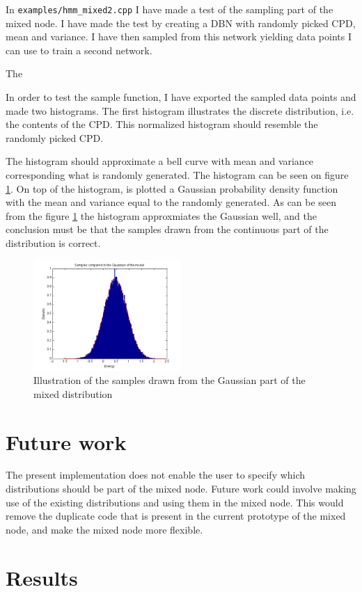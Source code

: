 \documentclass[10pt, conference, compsocconf,a4paper]{IEEEtran}
\begin{document}
In \texttt{examples/hmm\_mixed2.cpp} I have made a test of the sampling part of the mixed node. I have made the test by creating a DBN with randomly picked CPD, mean and variance. I have then sampled from this network yielding data points I can use to train a second network.

The 

In order to test the sample function, I have exported the sampled data points and made two histograms. The first histogram illustrates the discrete distribution, i.e. the contents of the CPD. This normalized histogram should resemble the randomly picked CPD.

The histogram should approximate a bell curve with mean and variance corresponding what is randomly generated. The histogram can be seen on figure \ref{fig1}. On top of the histogram, is plotted a Gaussian probability density function with the mean and variance equal to the randomly generated. As can be seen from the figure \ref{fig1} the histogram approxmiates the Gaussian well, and the conclusion must be that the samples drawn from the continuous part of the distribution is correct.

\begin{figure}
\centering
\includegraphics[width=0.5\textwidth]{figures/fig1.png}
\caption{Illustration of the samples drawn from the Gaussian part of the mixed distribution}
\label{fig1}
\end{figure}



\section{Future work} %
\label{sec:future_work}
The present implementation does not enable the user to specify which distributions should be part of the mixed node. Future work could involve making use of the existing distributions and using them in the mixed node. This would remove the duplicate code that is present in the current prototype of the mixed node, and make the mixed node more flexible.


\section{Results} %
\label{sec:results}






\end{document}
